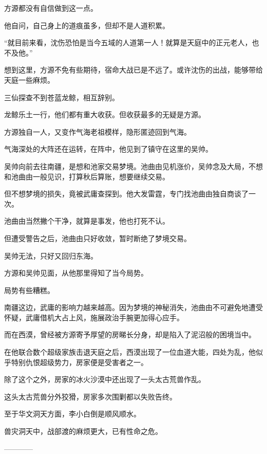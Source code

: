 \begin{this_body}
方源都没有自信做到这一点。

他自问，自己身上的道痕虽多，但却不是人道积累。

“就目前来看，沈伤恐怕是当今五域的人道第一人！就算是天庭中的正元老人，也不及他。”

想到这里，方源不免有些期待，宿命大战已是不远了。或许沈伤的出战，能够带给天庭一些麻烦。

三仙探查不到苍蓝龙鲸，相互辞别。

龙鲸乐土一行，他们都有重大收获。但收获最多的无疑是方源。

方源独自一人，又变作气海老祖模样，隐形匿迹回到气海。

气海深处的大阵还在运转，在阵中，他见到了镇守在这里的吴帅。

吴帅向前去往南疆，是想和池家交易梦境。池曲由见机涨价，吴帅念及大局，不想和池曲由一般见识，打算秋后算账，想要继续交易。

但不想梦境的损失，竟被武庸查探到。他大发雷霆，专门找池曲由独自商谈了一次。

池曲由当然撇个干净，就算是事发，他也打死不认。

但遭受警告之后，池曲由只好收敛，暂时断绝了梦境交易。

吴帅无法，只好又回归东海。

方源和吴帅见面，从他那里得知了当今局势。

局势有些糟糕。

南疆这边，武庸的影响力越来越高。因为梦境的神秘消失，池曲由不可避免地遭受怀疑，武庸借机大占上风，施展政治手腕更加得心应手。

而在西漠，曾经被方源寄予厚望的房睇长分身，却是陷入了泥沼般的困境当中。

在他联合数个超级家族击退天庭之后，西漠出现了一位血道大能，四处为乱，他似乎特别仇恨超级势力，房家便是受害者之一。

除了这个之外，房家的冰火沙漠中还出现了一头太古荒兽作乱。

这头太古荒兽分外狡猾，房家多次围剿都以失败告终。

至于华文洞天方面，李小白倒是顺风顺水。

兽灾洞天中，战部渡的麻烦更大，已有性命之危。

------------

\end{this_body}

